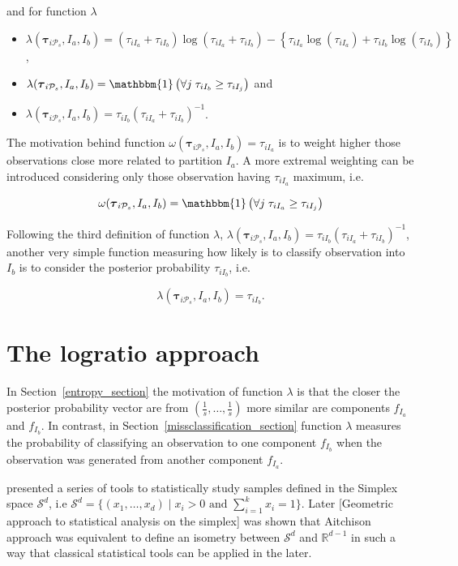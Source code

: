 \documentclass[10pt, a4paper]{article}
\newcommand{\m}[1]{\boldsymbol{#1}}
\begin{document}
\begin{spacing}{1.9}
and for function $\lambda$ 

\begin{itemize}
\item $\lambda(\m\tau_{i \mathcal{P}_s},  I_a,  I_b) =  (\tau_{iI_a}+\tau_{iI_b}) \log(\tau_{iI_a} + \tau_{iI_b}) - \left\{ \tau_{iI_a} \log(\tau_{iI_a}) + \tau_{iI_b} \log(\tau_{iI_b}) \right\}$,
\item $\lambda(\m\tau_{i \mathcal{P}_s},  I_a,  I_b) = \mathbbm{1}\left( \forall j\; \tau_{i I_{b}} \geq \tau_{iI_j} \right)$ and
\item $\lambda(\m\tau_{i \mathcal{P}_s},  I_a,  I_b) = \tau_{iI_b} (\tau_{iI_a} + \tau_{iI_b})^{-1}$.
\end{itemize}

The motivation behind function $\omega(\m\tau_{i \mathcal{P}_s},  I_a,  I_b) = \tau_{iI_a}$ is to weight higher those observations close more related to partition $I_a$. A more extremal weighting can be introduced considering only those observation having $ \tau_{iI_a}$ maximum, i.e.

\[
\omega(\m\tau_{i \mathcal{P}_s},  I_a,  I_b) = \mathbbm{1}\left( \forall j\; \tau_{i I_{a}} \geq \tau_{iI_j} \right)
\]

Following the third definition of function $\lambda$, $\lambda(\m\tau_{i \mathcal{P}_s},  I_a,  I_b) = \tau_{iI_b} (\tau_{iI_a} + \tau_{iI_b})^{-1}$, another very simple function measuring how likely is to classify observation into $I_b$ is to consider the posterior probability $\tau_{i I_{b}}$, i.e.

\[
\lambda(\m\tau_{i \mathcal{P}_s},  I_a,  I_b) = \tau_{iI_b}.
\]

\section{The logratio approach}

In Section~\ref{entropy_section} the motivation of function $\lambda$ is that the closer the posterior probability vector are from $(\frac{1}{s}, \dots, \frac{1}{s})$ more similar are components $f_{I_a}$ and $f_{I_b}$. In contrast, in Section~\ref{missclassification_section} function $\lambda$ measures  the probability of classifying an observation to one component $f_{I_b}$ when the observation was generated from another component $f_{I_a}$.

\cite{aitchison1986statistical} presented a series of tools to statistically study samples defined in the Simplex space $\mathcal{S}^d$, i.e $\mathcal{S}^d = \{ (x_1,\dots, x_d) \;|\; x_i > 0 \text{ and } \sum_{i=1}^k x_i = 1 \}$. Later [Geometric approach to statistical analysis on the simplex] was shown that Aitchison approach was equivalent to define an isometry between $\mathcal{S}^d$ and $\mathbb{R}^{d-1}$ in such a way that classical statistical tools can be applied in the later. 


\end{spacing}
\end{document}
